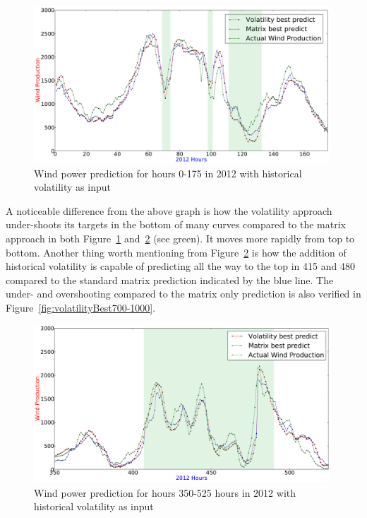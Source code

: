 \begin{figure}[H]
\centering
\includegraphics[width=0.99\textwidth]{billeder/bestVolatilityVsMatrixGraph.png}
\caption{Wind power prediction for hours 0-175 in 2012 with historical volatility as input}
\label{fig:bestVolatilityVsMatrixGraph}
\end{figure} 

A noticeable difference from the above graph is how the volatility approach under-shoots its targets in the bottom of many curves compared to the matrix approach in both Figure~\ref{fig:bestVolatilityVsMatrixGraph} and~\ref{fig:bestVolatilityVsMatrixGraph350-525} (see green). It moves more rapidly from top to bottom. Another thing worth mentioning from Figure~\ref{fig:bestVolatilityVsMatrixGraph350-525} is how the addition of historical volatility is capable of predicting all the way to the top in 415 and 480 compared to the standard matrix prediction indicated by the blue line. The under- and overshooting compared to the matrix only prediction is also verified in Figure~\ref{fig:volatilityBest700-1000}.

\begin{figure}[H]
\centering
\includegraphics[width=0.99\textwidth]{billeder/bestVolatilityVsMatrixGraph350-525.png}
\caption{Wind power prediction for hours 350-525 hours in 2012 with historical volatility as input}
\label{fig:bestVolatilityVsMatrixGraph350-525}
\end{figure} 

